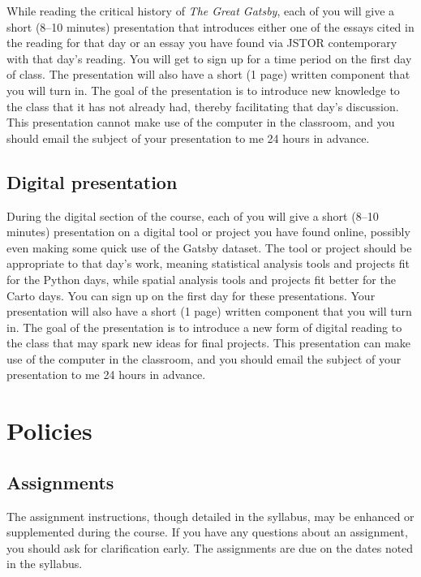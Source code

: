 While reading the critical history of \emph{The Great Gatsby}, each of you
will give a short (8–10 minutes) presentation that introduces either one of the
essays cited in the reading for that day or an essay you have found via JSTOR
contemporary with that day’s reading. You will get to sign up for a time period
on the first day of class. The presentation will also have a short (1 page)
written component that you will turn in. The goal of the presentation is to
introduce new knowledge to the class that it has not already had, thereby
facilitating that day’s discussion. This presentation cannot make use of the
computer in the classroom, and you should email the subject of your
presentation to me 24 hours in advance.

\subsection{Digital presentation}
\label{digitalpresentation}

During the digital section of the course, each of you will give a short (8–10
minutes) presentation on a digital tool or project you have found online,
possibly even making some quick use of the Gatsby dataset. The tool or
project should be appropriate to that day’s work, meaning statistical analysis
tools and projects fit for the Python days, while spatial analysis
tools and projects fit better for the Carto days. You can sign up
on the first day for these presentations. Your presentation will also have a
short (1 page) written component that you will turn in. The goal of the
presentation is to introduce a new form of digital reading to the class that
may spark new ideas for final projects. This presentation can make use of the
computer in the classroom, and you should email the subject of your
presentation to me 24 hours in advance.

\section{Policies}
\label{policies}

\subsection{Assignments}
\label{assignments}

The assignment instructions, though detailed in the syllabus, may be enhanced
or supplemented during the course. If you have any questions about an
assignment, you should ask for clarification early. The assignments are due on
the dates noted in the syllabus. 

